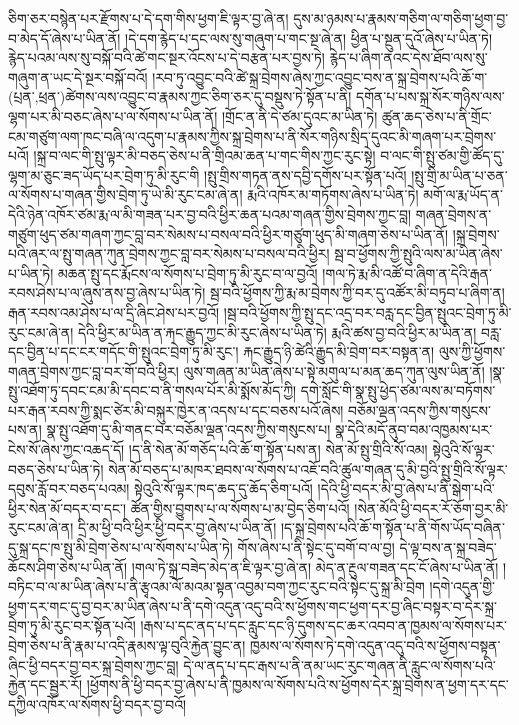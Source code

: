 ཅིག་ཅར་བསྙེན་པར་རྫོགས་པ་དེ་དག་གིས་ཕྱག་ཇི་ལྟར་བྱ་ཞེ་ན། དུས་མ་ཉམས་པ་རྣམས་གཅིག་ལ་གཅིག་ཕྱག་བྱ་བ་མེད་དོ་ཞེས་པ་ཡིན་ནོ། །དེ་དག་རྙེད་པ་དང་ལས་སུ་གཞུག་པ་གང་སྔ་ཞེ་ན། ཕྱིན་པ་སྔུན་དུའོ་ཞེས་པ་ཡིན་ཏེ། རྙེད་པའམ་ལས་སུ་བསྐོ་བའི་ཚེ་གང་སྔར་འོངས་པ་དེ་བརྩན་པར་བྱས་ཏེ། རྙེད་པ་ཞིག་ནའང་དེས་ཐོབ་ལས་སུ་གཞུག་ན་ཡང་དེ་སྔར་བསྐོ་བའོ། །རབ་ཏུ་འབྱུང་བའི་ཚེ་སྐྲ་བྲེགས་ཞེས་ཀྱང་འབྱུང་བས་ན་སྐྲ་བྲེགས་པའི་ཆོ་ག་(པྲན་‚ཕྲན་)ཚེགས་ལས་འབྱུང་བ་རྣམས་ཀྱང་ཅིག་ཅར་དུ་བསྡུས་ཏེ་སྟོན་པ་ནི། དགོན་པ་པས་སྐྲ་སོར་གཉིས་ལས་ལྷག་པར་མི་བཅང་ཞེས་པ་ལ་སོགས་པ་ཡིན་ནོ། །གྲོང་ན་ནི་དེ་ཙམ་དུའང་མ་ཡིན་ཏེ། ཚུན་ཆད་ཅེས་པ་ནི་གྲོང་ངམ་གཙུག་ལག་ཁང་བཞི་ལ་འདུག་པ་རྣམས་ཀྱིས་སྐྲ་བྲེགས་པ་ནི་སོར་གཉིས་སྲིད་དུའང་མི་གཞག་པར་བྲེགས་པའོ། །སྐྲ་བ་ལང་གི་སྤུ་ལྟར་མི་བཅད་ཅེས་པ་ནི་གྲིའམ་ཆན་པ་གང་གིས་ཀྱང་རུང་སྟེ། བ་ལང་གི་སྤུ་ཙམ་གྱི་ཚོད་དུ་ལྷག་མ་ཅུང་ཟད་ཡོད་པར་བྲེག་ཏུ་མི་རུང་གི །སྤུ་གྲིས་གཏན་ནས་དབྱི་དགོས་པར་སྟོན་པའོ། །སྤུ་གྲི་མ་ཡིན་པ་ཅན་ལ་སོགས་པ་གཞན་གྱིས་བྲེག་ཏུ་ཡེ་མི་རུང་ངམ་ཞེ་ན། རྨའི་འཁོར་མ་གཏོགས་ཞེས་པ་ཡིན་ཏེ། མགོ་ལ་རྨ་ཡོད་ན་དེའི་ཉེན་འཁོར་ཙམ་རྨ་ལ་མི་གཟན་པར་བྱ་བའི་ཕྱིར་ཆན་པའམ་གཞན་གྱིས་བྲེགས་ཀྱང་བླ། གཞན་བྲེགས་ན་གཙུག་ཕུད་ཙམ་གཞག་ཀྱང་བླ་བར་སེམས་པ་བསལ་བའི་ཕྱིར་གཙུག་ཕུད་མི་གཞག་ཅེས་པ་ཡིན་ནོ། །སྐྲ་བྲེགས་པའི་ཞར་ལ་སྤུ་གཞན་ཀུན་བྲེགས་ཀྱང་བླ་བར་སེམས་པ་བསལ་བའི་ཕྱིར། སྦ་བ་ཕྱོགས་ཀྱི་སྤུའི་ལས་མ་ཡིན་ཞེས་པ་ཡིན་ཏེ། མཆན་སྤུ་དང་རྨོངས་ལ་སོགས་པ་བྲེག་ཏུ་མི་རུང་བ་ལ་བྱའོ། །གལ་ཏེ་རྨ་མི་འཚོ་བ་ཞིག་ན་དེའི་རྒན་རབས་ཤེས་པ་ལ་ཞུས་ནས་བྱ་ཞེས་པ་ཡིན་ཏེ། སྦ་བའི་ཕྱོགས་ཀྱི་རྨ་མ་བྲེགས་ཀྱི་བར་དུ་འཚོར་མི་བཏུབ་པ་ཞིག་ན། རྒན་རབས་འམ་ཤེས་པ་ལ་དྲི་ཞིང་ཤེས་པར་བྱའོ། །སྦ་བའི་ཕྱོགས་ཀྱི་སྤུ་དང་འདྲ་བར་བརླ་དང་བྱིན་སྤུའང་བྲེག་ཏུ་མི་རུང་ངམ་ཞེ་ན། དེའི་ཕྱིར་མ་ཡིན་ན་རྐང་རྒྱུད་ཀྱང་མི་རུང་ཞེས་པ་ཡིན་ཏེ། རྨའི་ཚས་བྱ་བའི་ཕྱིར་མ་ཡིན་ན། བརླ་དང་བྱིན་པ་དང་ངར་གདོང་གི་སྤུའང་བྲེག་ཏུ་མི་རུང་། རྐང་རྒྱུད་ཉི་ཚེའི་རྒྱུད་མི་བྲེག་བར་བསྟན་ན། ལུས་ཀྱི་ཕྱོགས་གཞན་བྲེགས་ཀྱང་བླ་བར་གོ་བའི་ཕྱིར། ལུས་གཞན་མ་ཡིན་ཞེས་པ་སྟེ་མགུལ་པ་མན་ཆད་ཀུན་ལུས་ཡིན་ནོ། །སྣ་སྤུ་འཐོག་ཏུ་དབང་ངམ་མི་དབང་བ་ནི་གསལ་པོར་མི་སྨོས་མོད་ཀྱི། དགེ་སློང་གི་སྣ་སྤུ་ཕྱེད་ཙམ་ལས་མ་བཏོགས་པར་རྒན་རབས་ཀྱི་སྨང་ཙེར་མི་བསྐུར་ཁྱེར་ན་འདས་པ་དང་བཅས་པའོ་ཞེས། བཅོམ་ལྡན་འདས་ཀྱིས་གསུངས་པས་ན། སྣ་སྤུ་འཐོག་དུ་མི་གནང་བར་བཅོམ་ལྡན་འདས་ཀྱིས་གསུངས་པ། སྣ་དེའི་མདོ་ནུབ་བམ་འཁྱམས་པར་ངེས་སོ་ཞེས་ཀྱང་འཆད་དོ། །ད་ནི་སེན་མོ་གཅོད་པའི་ཆོ་ག་སྟོན་པས་ན། སེན་མོ་སྤུ་གྲིའི་སོ་འམ། སྟེའུའི་སོ་ལྟར་བཅད་ཅེས་པ་ཡིན་ཏེ། སེན་མོ་བཅད་པ་མཁར་ཐབས་ལ་སོགས་པ་འཇོ་བའི་ཚུལ་གཞན་དུ་མི་བྱའི་སྤུ་གྲིའི་སོ་ལྟར་དབུས་རློ་བར་བཅད་པའམ། སྟེའུའི་སོ་ལྟར་ཁད་ཆད་དུ་ཆོད་ཅིག་པའོ། །དེའི་ཕྱི་བདར་མི་བྱ་ཞེས་པ་ནི་སྒེག་པའི་ཕྱིར་སེན་མོ་བདར་བ་དང་། ཚོན་གྱིས་བྱུགས་པ་ལ་སོགས་པ་མ་བྱེད་ཅིག་པའོ། །སེན་མོའི་ཕྱི་བདར་རོ་ཅོག་བྱར་མི་རུང་ངམ་ཞེ་ན། དྲི་མ་ཕྱི་བའི་ཕྱིར་ཕྱི་བདར་བྱ་ཞེས་པ་ཡིན་ནོ། །ད་སྐྲ་བྲེགས་པའི་ཆོ་ག་སྟོན་པ་ནི་གོས་ཡོད་བཞིན་དུ་སྐྲ་དང་ཁ་སྤུ་མི་བྲེག་ཅེས་པ་ལ་སོགས་པ་ཡིན་ཏེ། གོས་ཞེས་པ་ནི་སྟེང་དུ་བགོ་བ་ལ་བྱ། དེ་ལྟ་བས་ན་སྐྲ་བཟེད་ཆོངས་ཤིག་ཅེས་པ་ཡིན་ནོ། །གལ་ཏེ་སྐྲ་བཟེད་མེད་ན་ཇི་ལྟར་བྱ་ཞེ་ན། མེད་ན་རྔུལ་གཟན་དང་ངོ་ཞེས་པ་ཡིན་ནོ། །བཏིང་བ་ལ་མ་ཡིན་ཞེས་པ་ནི་རྩྭའམ་ལོ་མའམ་སྟན་འབྱམ་བག་ཀྱང་རུང་བའི་སྟེང་དུ་སྐྲ་མི་བྲེག །དགེ་འདུན་གྱི་ཕྱག་དར་གང་དུ་བྱ་བར་མ་ཡིན་ཞེས་པ་ནི་དགེ་འདུན་འདུ་བའི་ས་ཕྱོགས་གང་ཕྱག་དར་བྱ་ཞིང་བསྟར་བ་དེར་སྐྲ་བྲེག་ཏུ་མི་རུང་བར་སྟོན་པའོ། །རྒས་པ་དང་ནད་པ་དང་རླུང་དང་ཉི་དུགས་དང་ཆར་འབབ་ན་ཁྱམས་ལ་སོགས་པར་བྲེག་ཅེས་པ་ནི་རྣམ་པ་འདི་རྣམས་ལྟ་བུའི་རྐྱེན་བྱུང་ན། ཁྱམས་ལ་སོགས་ཏེ་དགེ་འདུན་འདུ་བའི་ས་ཕྱོགས་བསྟན་ཞིང་ཕྱི་བདར་བྱ་བར་སྐྲ་བྲེགས་ཀྱང་བླ། དེ་ལ་ནད་པ་དང་རྒས་པ་ནི་ནམ་ཡང་རུང་གཞན་ནི་རླུང་ལ་སོགས་པའི་རྐྱེན་དང་སྦྱར་རོ། །ཕྱོགས་ནི་ཕྱི་བདར་བྱ་ཞེས་པ་ནི་ཁྱམས་ལ་སོགས་པའི་ས་ཕྱོགས་དེར་སྐྲ་བྲེགས་ན་ཕྱག་དར་དང་དཀྱིལ་འཁོར་ལ་སོགས་ཕྱི་བདར་བྱ་བའོ། 